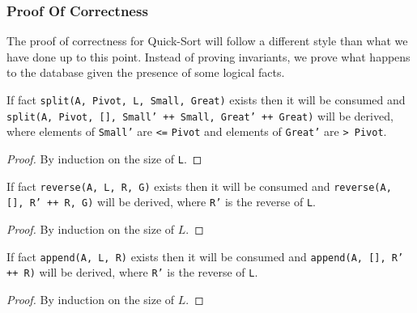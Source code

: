 \subsubsection{Proof Of Correctness}

The proof of correctness for Quick-Sort will follow a different style than what
we have done up to this point. Instead of proving invariants, we prove what
happens to the database given the presence of some logical facts.

\begin{lemma}

If fact \texttt{split(A, Pivot, L, Small, Great)} exists then it will be
consumed and \texttt{split(A, Pivot, [], Small' ++ Small, Great' ++ Great)} will
be derived, where elements of \texttt{Small'} are \texttt{<=} \texttt{Pivot} and
elements of \texttt{Great'} are \texttt{> Pivot}.

\end{lemma}
\begin{proof}
By induction on the size of \texttt{L}.
\end{proof}

\begin{lemma}

If fact \texttt{reverse(A, L, R, G)} exists then it will be consumed and
\texttt{reverse(A, [], R' ++ R, G)} will be derived, where \texttt{R'} is the
reverse of \texttt{L}.

\end{lemma}
\begin{proof}
By induction on the size of $L$.
\end{proof}

\begin{lemma}
If fact \texttt{append(A, L, R)} exists then it will be consumed and
\texttt{append(A, [], R' ++ R)} will be derived, where \texttt{R'} is the reverse of \texttt{L}.
\end{lemma}
\begin{proof}
By induction on the size of $L$.
\end{proof}

